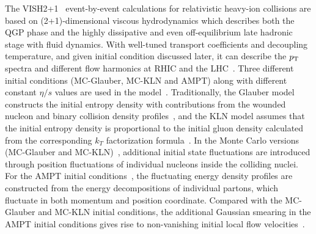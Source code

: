 The VISH2+1~\cite{Shen:2010uy,Shen:2014vra} event-by-event calculations for relativistic heavy-ion collisions are based on (2+1)-dimensional viscous hydrodynamics which describes both the QGP phase and the highly dissipative and even off-equilibrium late hadronic stage with fluid dynamics. With well-tuned transport coefficients and decoupling temperature, and given initial condition discussed later, it can describe the $p_{\rm T}$ spectra and different flow harmonics at RHIC and the LHC~\cite{Qiu:2011hf, Shen:2010uy, Shen:2011eg, Bhalerao:2015iya}.
Three different initial conditions ({MC-Glauber}, {MC-KLN} and {AMPT}) along with different constant $\eta/s$ values are used in the model~\cite{Zhu:2016puf}. 
Traditionally, the Glauber model constructs the initial entropy density with contributions from the wounded nucleon and binary collision density profiles~\cite{Kolb:2000sd}, and the {KLN} model assumes that the initial entropy density is proportional to the initial gluon density calculated from the corresponding $k_T$ factorization formula~\cite{Kharzeev:2000ph}. In the Monte Carlo versions ({MC-Glauber} and {MC-KLN})~\cite{Miller:2007ri,Drescher:2006ca,Hirano:2009ah}, additional initial state fluctuations are introduced through position fluctuations of individual nucleons inside the colliding nuclei. For the {AMPT} initial conditions~\cite{Bhalerao:2015iya,Pang:2012he,Xu:2016hmp}, the fluctuating energy density profiles are constructed from the energy decompositions of individual partons, which fluctuate in both momentum and position coordinate. Compared with the {MC-Glauber} and {MC-KLN} initial conditions, the additional Gaussian smearing in the {AMPT} initial conditions gives rise to non-vanishing initial local flow velocities~\cite{Pang:2012he}.

